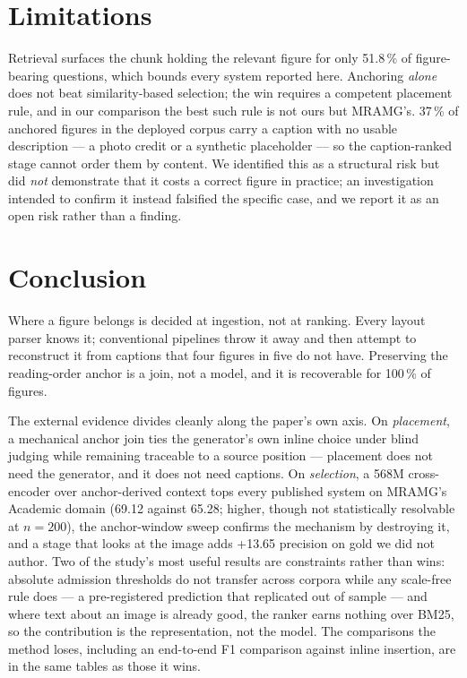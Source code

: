 \documentclass[journal]{IEEEtran}
\begin{document}
\section{Limitations}

Retrieval surfaces the chunk holding the relevant figure for only 51.8\,\% of
figure-bearing questions, which bounds every system reported here. Anchoring
\emph{alone} does not beat similarity-based selection; the win requires a
competent placement rule, and in our comparison the best such rule is not ours but
MRAMG's. 37\,\% of anchored figures in the deployed corpus carry a caption with no
usable description --- a photo credit or a synthetic placeholder --- so the
caption-ranked stage cannot order them by content. We identified this as a
structural risk but did \emph{not} demonstrate that it costs a correct figure in
practice; an investigation intended to confirm it instead falsified the specific
case, and we report it as an open risk rather than a finding.

\section{Conclusion}

Where a figure belongs is decided at ingestion, not at ranking. Every layout
parser knows it; conventional pipelines throw it away and then attempt to
reconstruct it from captions that four figures in five do not have. Preserving the
reading-order anchor is a join, not a model, and it is recoverable for 100\,\% of
figures.

The external evidence divides cleanly along the paper's own axis. On
\emph{placement}, a mechanical anchor join ties the generator's own inline
choice under blind judging while remaining traceable to a source position ---
placement does not need the generator, and it does not need captions. On
\emph{selection}, a 568M cross-encoder over anchor-derived context tops every
published system on MRAMG's Academic domain (69.12 against 65.28; higher,
though not statistically resolvable at $n=200$), the anchor-window sweep
confirms the mechanism by destroying it, and a stage that looks at the image
adds +13.65 precision on gold we did not author. Two of the study's most
useful results are constraints rather than wins: absolute admission thresholds
do not transfer across corpora while any scale-free rule does --- a
pre-registered prediction that replicated out of sample --- and where text
about an image is already good, the ranker earns nothing over BM25, so the
contribution is the representation, not the model. The comparisons the method
loses, including an end-to-end F1 comparison against inline insertion, are in
the same tables as those it wins.
\end{document}

